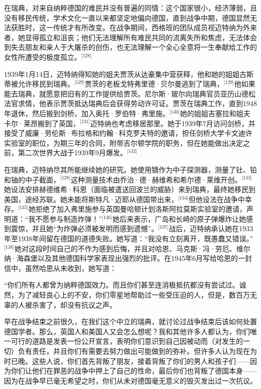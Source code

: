 在瑞典，对来自纳粹德国的难民并没有普遍的同情：这个国家很小，经济薄弱，且没有移民传统，学术文化一直以来都坚定地偏向德国，直到战争中期，德国显然无法获胜时，这一传统才有所改变。在战争期间，西格班的团队成员视迈特纳为外来者，她显得孤立和沮丧；他们无法理解所有难民共同的流离失所和焦虑，无法体会到失去朋友和亲人于大屠杀的创伤，也无法理解一个全心全意将一生奉献给工作的女性所遭受的极度孤立。\(^\text{[128]}\)

1939年1月14日，迈特纳得知她的姐夫贾茨从达豪集中营获释，他和她的姐姐古斯蒂被允许移民到瑞典。\(^\text{[129]}\)贾茨的老板戈特弗里德·贝尔曼逃到了瑞典，\(^\text{[129]}\)他如果能去瑞典，就愿意把旧有的工作提供给贾茨。尼尔斯·玻尔向瑞典官员亚历山德松法官求情，他表示贾茨抵达瑞典后会获得劳动许可证。贾茨在瑞典工作，直到1948年退休，然后搬到剑桥，加入奥托·罗伯特·弗里施。\(^\text{[130]}\)她的姐姐吉塞拉和姐夫卡尔·莱昂搬到了英国，\(^\text{[131]}\)迈特纳也考虑移居那里。她于1939年7月访问剑桥，并接受了威廉·劳伦斯·布拉格和约翰·科克罗夫特的邀请，担任剑桥大学卡文迪许实验室的职位，为期三年的合同，附带吉尔顿学院的职务，但在她能做出决定之前，第二次世界大战于1939年9月爆发。\(^\text{[132]}\)

在瑞典，迈特纳尽其所能继续她的研究。她使用镝作为中子探测器，测量了钍、铅和铀的中子截面，\(^\text{[128]}\)这种测量技术由乔治·德·赫维希和希尔德·莱维开创。\(^\text{[133]}\)她设法安排赫德维希·科恩（面临被遣送回波兰的威胁）来到瑞典，最终她移民到美国，途经苏联。她未能将斯特凡·迈耶从德国带出来，\(^\text{[134]}\)但他设法在战争中幸存。\(^\text{[135]}\)她拒绝了加入弗里施参与英国曼哈顿计划洛斯阿拉莫斯实验室的邀请，声明道：“我不愿参与制造炸弹！”\(^\text{[136]}\)她后来表示，广岛和长崎的原子弹爆炸让她感到震惊，并且她“为炸弹必须被发明而感到遗憾”。\(^\text{[137]}\)战后，迈特纳承认她在1933年至1938年间留在德国的道德失败。她写道：“我没有立刻离开，既愚蠢又错误。”\(^\text{[138]}\)她对这段时间自己的不作为感到后悔，并且对哈恩、马克斯·冯·劳厄、维尔纳·海森堡以及其他德国科学家表现出强烈的批评。在1945年6月写给哈恩的一封信中，虽然哈恩从未收到，她写道：

“你们所有人都曾为纳粹德国效力。而且你们甚至连消极抵抗都没有尝试过。诚然，为了减轻良心上的不安，你们零星地帮助过一些受压迫的人，但是，数百万无辜的人被杀害了，却没有抗议之声。

早在战争结束之前很久，在我们这个中立的瑞典，就讨论过战争结束后该如何处置德国学者。那么，英国人和美国人又会怎么想呢？我和其他许多人都认为，你们唯一可行的道路是发表一份公开宣言，表明你们意识到自己因被动而（对发生的一切）负有责任，并且你们有需要去努力做出可能做到的弥补。但许多人认为现在为时已晚。这些人说，你们首先背叛了朋友，接着背叛了你们的男人和孩子们——因为你们让他们在罪恶的战争中押上了自己的性命，最后你们也背叛了德国本身——因为在战争早已毫无希望之时，你们从未对德国毫无意义的毁灭发出过一次抗议。

